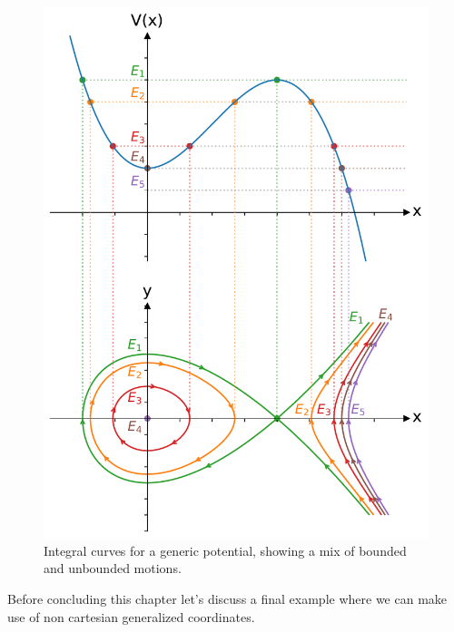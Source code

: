 \documentclass[english,fontsize=11pt,paper=a5,oneside]{scrbook}
\theoremstyle{definition}
\begin{document}
\begin{figure}[htbp]
  \centering
  \includegraphics[width=.7\linewidth]{images/potential-curves.pdf}
  \caption{Integral curves for a generic potential, showing a mix of bounded and unbounded motions.}
  \label{fig:potential-curves}
\end{figure}

Before concluding this chapter let's discuss a final example where we can make use of non cartesian generalized coordinates.
\end{document}
